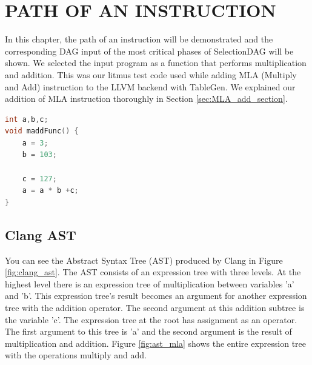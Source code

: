 \clearpage
\chapter{PATH OF AN INSTRUCTION}\label{Ch4}
In this chapter, the path of an instruction will be demonstrated and the corresponding DAG input of the most critical phases of SelectionDAG will be shown. We selected the input program as a function that performs multiplication and addition. This was our litmus test code used while adding MLA (Multiply and Add) instruction to the LLVM backend with TableGen. We explained our addition of MLA instruction thoroughly in Section \ref{sec:MLA_add_section}. 

\begin{lstlisting}[language=C, caption=madd.c program]
int a,b,c;
void maddFunc() {
	a = 3;
	b = 103;
	
	c = 127;
	a = a * b +c;
}
\end{lstlisting}

\section{Clang AST}
You can see the Abstract Syntax Tree (AST) produced by Clang in Figure \ref{fig:clang_ast}. The AST consists of an expression tree with three levels. At the highest level there is an expression tree of multiplication between variables 'a' and 'b'. This expression tree's result becomes an argument for another expression tree with the addition operator. The second argument at this addition subtree is the variable 'c'. The expression tree at the root has assignment as an operator. The first argument to this tree is 'a' and the second argument is the result of multiplication and addition. Figure \ref{fig:ast_mla} shows the entire expression tree with the operations multiply and add. 

